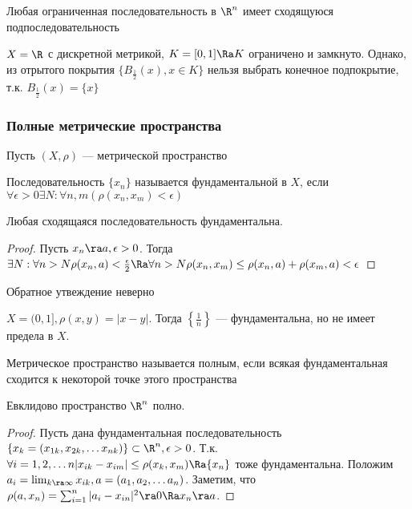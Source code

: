 
\begin{corollary}
    Любая ограниченная последовательность в \(\R^n\) имеет сходящуюся подпоследовательность
\end{corollary}


\begin{example}
    \(X = \R\) с дискретной метрикой, \(K = [0, 1] \Ra K\) ограничено и замкнуто. Однако, из отрытого покрытия \(\{B_\frac{1}{2}(x), x \in K\}\) нельзя выбрать конечное подпокрытие, т.к. \(B_\frac{1}{2}(x) = \{x\}\)
\end{example}

\subsubsection{Полные метрические пространства}
Пусть \((X, \rho)\) --- метрической пространство
\begin{definition}
    Последовательность \(\{x_n\}\) называется фундаментальной в \(X\), если \(\forall \epsilon > 0 \exists N: \forall n, m (\rho(x_n, x_m) < \epsilon)\)
\end{definition}

\begin{lemma}
    Любая сходящаяся последовательность фундаментальна.
\end{lemma}
\begin{proof}
    Пусть \(x_n \ra a, \epsilon > 0\). Тогда \(\exists N: \forall n > N \rho(x_n, a) < \frac{\epsilon}{2} \Ra \forall n > N \rho(x_n, x_m) \le \rho(x_n, a) + \rho(x_m, a) < \epsilon\)
\end{proof}

\begin{note}
    Обратное утвеждение неверно
\end{note}
\begin{example}
    \(X = (0, 1], \rho(x, y) = |x - y|\). Тогда \(\left\{\frac{1}{n}\right\}\) --- фундаментальна, но не имеет предела в \(X\).
\end{example}

\begin{definition}
    Метрическое пространство называется полным, если всякая фундаментальная сходится к некоторой точке этого пространства
\end{definition}

\begin{lemma}
    Евклидово пространство \(\R^n\) полно.
\end{lemma}
\begin{proof}
    Пусть дана фундаментальная последовательность \(\{x_k = (x_{1k}, x_{2k}, \dots x_{nk})\} \subset \R^n, \epsilon > 0\). Т.к. \(\forall i = 1, 2,\dots n |x_{ik} - x_{im}| \le \rho(x_k, x_m) \Ra \{x_n\}\) тоже фундаментальна. Положим \(a_i = \lim_{k \ra \infty} x_{ik}, a = (a_1, a_2, \dots a_n)\). Заметим, что \(\rho(a, x_n) = \sum_{i = 1}^n |a_i - x_{in}|^2 \ra 0 \Ra x_n \ra a\).
\end{proof}

